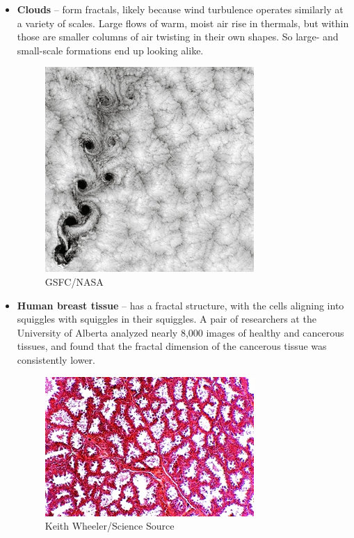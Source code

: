 \documentclass{article}
\begin{document}
\begin{itemize}
\item \textbf{Clouds} --  form fractals, likely because wind turbulence operates similarly at a variety of scales. Large flows of warm, moist air rise in thermals, but within those are smaller columns of air twisting in their own shapes. So large- and small-scale formations end up looking alike.
\begin{figure}[H]
\centering
\includegraphics[scale=1.3]{DSC-B0818_12.jpg}
\caption{GSFC/NASA}
\end{figure}

\item \textbf{Human breast tissue} --  has a fractal structure, with the cells aligning into squiggles with squiggles in their squiggles. A pair of researchers at the University of Alberta analyzed nearly 8,000 images of healthy and cancerous tissues, and found that the fractal dimension of the cancerous tissue was consistently lower.
\begin{figure}[H]
\centering
\includegraphics[scale=1.1]{DSC-B0818_13.jpg}
\caption{Keith Wheeler/Science Source}
\end{figure}

\end{itemize}
\end{document}

